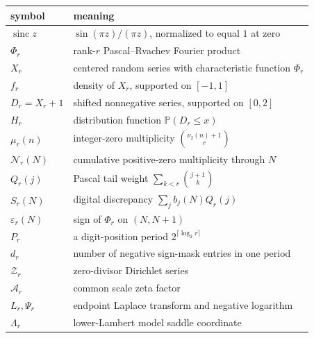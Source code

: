 \documentclass[11pt,a4paper]{article}
\theoremstyle{frontier}
\theoremstyle{definition}
\newcommand{\sinc}{\operatorname{sinc}}
\newcommand{\Pp}{\mathbb P}
\begin{document}
\begin{center}
\begin{tabularx}{\textwidth}{@{}lX@{}}
\toprule
symbol & meaning\\
\midrule
$\sinc z$ & $\sin(\pi z)/(\pi z)$, normalized to equal $1$ at zero\\
$\Phi_r$ & rank-$r$ Pascal--Rvachev Fourier product\\
$X_r$ & centered random series with characteristic function $\Phi_r$\\
$f_r$ & density of $X_r$, supported on $[-1,1]$\\
$D_r=X_r+1$ & shifted nonnegative series, supported on $[0,2]$\\
$H_r$ & distribution function $\Pp(D_r\le x)$\\
$\mu_r(n)$ & integer-zero multiplicity $\binom{\nu_2(n)+1}{r}$\\
$\mathcal N_r(N)$ & cumulative positive-zero multiplicity through $N$\\
$Q_r(j)$ & Pascal tail weight $\sum_{k<r}\binom{j+1}{k}$\\
$S_r(N)$ & digital discrepancy $\sum_jb_j(N)Q_r(j)$\\
$\varepsilon_r(N)$ & sign of $\Phi_r$ on $(N,N+1)$\\
$P_r$ & a digit-position period $2^{\lceil\log_2r\rceil}$\\
$d_r$ & number of negative sign-mask entries in one period\\
$\mathcal Z_r$ & zero-divisor Dirichlet series\\
$\mathcal A_r$ & common scale zeta factor\\
$L_r,\Psi_r$ & endpoint Laplace transform and negative logarithm\\
$\Lambda_r$ & lower-Lambert model saddle coordinate\\
\bottomrule
\end{tabularx}
\end{center}
\end{document}

